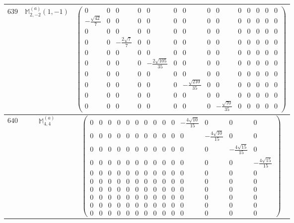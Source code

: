 \documentclass[fleqn,8pt,landscape]{jsarticle}
\begin{document}
\begin{center}
\begin{longtable}{ccc}
$ 639 $ & $ \mathbb{M}_{2,-2}^{(a)}(1,-1) $ & $ \begin{pmatrix} 0 & 0 & 0 & 0 & 0 & 0 & 0 & 0 & 0 & 0 & 0 & 0 & 0 & 0 \\ - \frac{\sqrt{42}}{7} & 0 & 0 & 0 & 0 & 0 & 0 & 0 & 0 & 0 & 0 & 0 & 0 & 0 \\ 0 & 0 & 0 & 0 & 0 & 0 & 0 & 0 & 0 & 0 & 0 & 0 & 0 & 0 \\ 0 & 0 & - \frac{2 \sqrt{7}}{7} & 0 & 0 & 0 & 0 & 0 & 0 & 0 & 0 & 0 & 0 & 0 \\ 0 & 0 & 0 & 0 & 0 & 0 & 0 & 0 & 0 & 0 & 0 & 0 & 0 & 0 \\ 0 & 0 & 0 & 0 & - \frac{2 \sqrt{105}}{35} & 0 & 0 & 0 & 0 & 0 & 0 & 0 & 0 & 0 \\ 0 & 0 & 0 & 0 & 0 & 0 & 0 & 0 & 0 & 0 & 0 & 0 & 0 & 0 \\ 0 & 0 & 0 & 0 & 0 & 0 & - \frac{\sqrt{210}}{35} & 0 & 0 & 0 & 0 & 0 & 0 & 0 \\ 0 & 0 & 0 & 0 & 0 & 0 & 0 & 0 & 0 & 0 & 0 & 0 & 0 & 0 \\ 0 & 0 & 0 & 0 & 0 & 0 & 0 & 0 & - \frac{\sqrt{70}}{35} & 0 & 0 & 0 & 0 & 0 \end{pmatrix} $ \\ \hline
$ 640 $ & $ \mathbb{M}_{4,4}^{(a)} $ & $ \begin{pmatrix} 0 & 0 & 0 & 0 & 0 & 0 & 0 & 0 & 0 & 0 & - \frac{4 \sqrt{10}}{15} & 0 & 0 & 0 \\ 0 & 0 & 0 & 0 & 0 & 0 & 0 & 0 & 0 & 0 & 0 & - \frac{4 \sqrt{10}}{15} & 0 & 0 \\ 0 & 0 & 0 & 0 & 0 & 0 & 0 & 0 & 0 & 0 & 0 & 0 & - \frac{4 \sqrt{15}}{15} & 0 \\ 0 & 0 & 0 & 0 & 0 & 0 & 0 & 0 & 0 & 0 & 0 & 0 & 0 & - \frac{4 \sqrt{15}}{15} \\ 0 & 0 & 0 & 0 & 0 & 0 & 0 & 0 & 0 & 0 & 0 & 0 & 0 & 0 \\ 0 & 0 & 0 & 0 & 0 & 0 & 0 & 0 & 0 & 0 & 0 & 0 & 0 & 0 \\ 0 & 0 & 0 & 0 & 0 & 0 & 0 & 0 & 0 & 0 & 0 & 0 & 0 & 0 \\ 0 & 0 & 0 & 0 & 0 & 0 & 0 & 0 & 0 & 0 & 0 & 0 & 0 & 0 \\ 0 & 0 & 0 & 0 & 0 & 0 & 0 & 0 & 0 & 0 & 0 & 0 & 0 & 0 \\ 0 & 0 & 0 & 0 & 0 & 0 & 0 & 0 & 0 & 0 & 0 & 0 & 0 & 0 \end{pmatrix} $ \\ \hline

\end{longtable}
\end{center}
\end{document}
